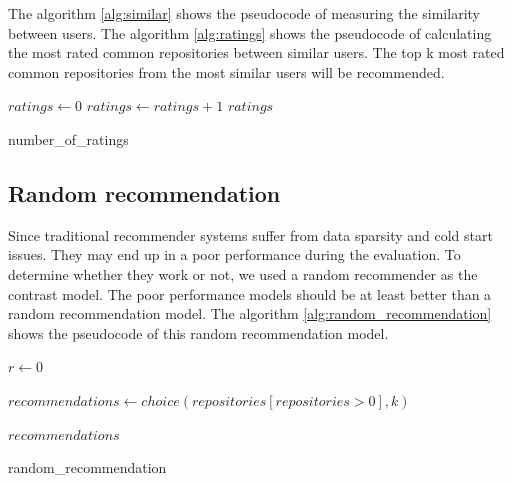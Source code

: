 \documentclass[11pt,twoside]{report}
\begin{document}
The algorithm \ref{alg:similar} shows the pseudocode of measuring the similarity between users. The algorithm \ref{alg:ratings} shows the pseudocode of calculating the most rated common repositories between similar users. The top k most rated common repositories from the most similar users will be recommended.

\begin{algorithm}[H]
    \DontPrintSemicolon
    

    $ratings \leftarrow 0$ \newline
    {
        {
            $ratings \leftarrow ratings + 1$
        }
    }
    \Return $ratings$
    
    \caption{number\_of\_ratings}
    \label{alg:ratings}
\end{algorithm}

\subsection{Random recommendation}
Since traditional recommender systems suffer from data sparsity and cold start issues. They may end up in a poor performance during the evaluation. To determine whether they work or not, we used a random recommender as the contrast model. The poor performance models should be at least better than a random recommendation model. The algorithm \ref{alg:random_recommendation} shows the pseudocode of this random recommendation model.

\begin{algorithm}[H]
    \DontPrintSemicolon
    

    {
        {
            $r \leftarrow 0$
        }
    }

    $recommendations \leftarrow choice(repositories[repositories>0], k)$

    \Return $recommendations$
    
    \caption{random\_recommendation}
    \label{alg:random_recommendation}
\end{algorithm}
\end{document}
